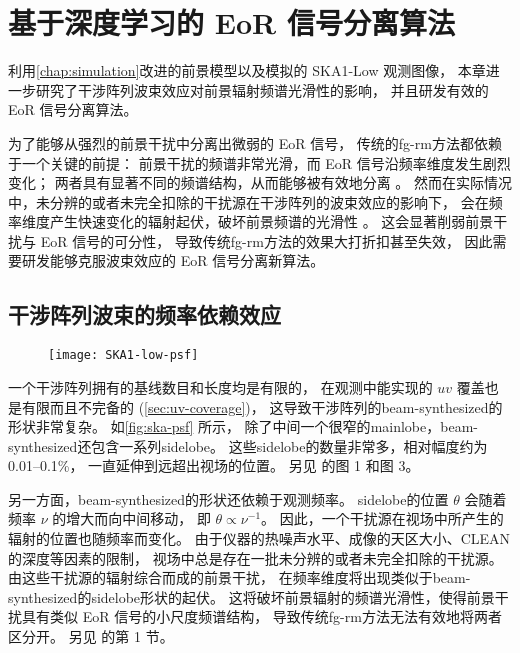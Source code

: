 
\chapter{基于深度学习的 EoR 信号分离算法}
\label{chap:cdae}

利用\autoref{chap:simulation}改进的前景模型以及模拟的 SKA1-Low 观测图像，
本章进一步研究了干涉阵列波束效应对前景辐射频谱光滑性的影响，
并且研发有效的 EoR 信号分离算法。

为了能够从强烈的前景干扰中分离出微弱的 EoR 信号，
传统的\ac{fg-rm}方法都依赖于一个关键的前提：
前景干扰的频谱非常光滑，而 EoR 信号沿频率维度发生剧烈变化；
两者具有显著不同的频谱结构，从而能够被有效地分离 \cite{morales2010,chapman2016}。
然而在实际情况中，未分辨的或者未完全扣除的干扰源在干涉阵列的波束效应的影响下，
会在频率维度产生快速变化的辐射起伏，破坏前景频谱的光滑性 \cite{liu2009ps}。
这会显著削弱前景干扰与 EoR 信号的可分性，
导致传统\ac{fg-rm}方法的效果大打折扣甚至失效，
因此需要研发能够克服波束效应的 EoR 信号分离新算法。


\section{干涉阵列波束的频率依赖效应}
\label{sec:beam-effect}

\begin{figure}[htp]
  \centering
  \texttt{[image: SKA1-low-psf]}
  \label{fig:ska-psf}
\end{figure}

一个干涉阵列拥有的基线数目和长度均是有限的，
在观测中能实现的 $uv$ 覆盖也是有限而且不完备的 (\autoref{sec:uv-coverage})，
这导致干涉阵列的\ac{beam-synthesized}的形状非常复杂。
如\autoref{fig:ska-psf} 所示，
除了中间一个很窄的\ac{mainlobe}，\ac{beam-synthesized}还包含一系列\ac{sidelobe}。
这些\ac{sidelobe}的数量非常多，相对幅度约为 \numrange{0.01}{0.1}\%，
一直延伸到远超出视场的位置。
另见  的图 1 和图 3。

另一方面，\ac{beam-synthesized}的形状还依赖于观测频率。
\ac{sidelobe}的位置 $\theta$ 会随着频率 $\nu$ 的增大而向中间移动，
即 $\theta \propto \nu^{-1}$。
因此，一个干扰源在视场中所产生的辐射的位置也随频率而变化。
由于仪器的热噪声水平、成像的天区大小、CLEAN 的深度等因素的限制，
视场中总是存在一批未分辨的或者未完全扣除的干扰源。
由这些干扰源的辐射综合而成的前景干扰，
在频率维度将出现类似于\ac{beam-synthesized}的\ac{sidelobe}形状的起伏。
这将破坏前景辐射的频谱光滑性，使得前景干扰具有类似 EoR 信号的小尺度频谱结构，
导致传统\ac{fg-rm}方法无法有效地将两者区分开。
另见  的第 1 节。



